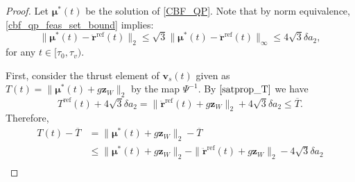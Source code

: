 \documentclass[journal,10pt]{IEEEtran}
\newcommand{\vect}[1]{\boldsymbol{\mathbf{#1}}}
\begin{document}
\begin{proof} 
Let $\vect{\mu}^*(t)$ be the solution of \eqref{CBF_QP}. Note that by norm equivalence, \eqref{cbf_qp_feas_set_bound} implies:
\begin{equation}
    \|\vect{\mu}^*(t) - \ddot{\vect{r}}^{\text{ref}}(t)\|_2\leq \sqrt{3}\|\vect{\mu}^*(t)-\ddot{\vect{r}}^{\text{ref}}(t)\|_\infty\leq4\sqrt{3}\delta a_2,\label{eqnprp3eq1}
\end{equation}
for any $t\in[\tau_0,\tau_v)$. 

First, consider the thrust element of $\vect{v}_s(t)$ given as $T(t) = \|\vect{\mu}^*(t)+g\vect{z}_W\|_2$ by the map $\Psi^{-1}$. By $\eqref{satprop_T}$ we have
\begin{equation}
    T^{\text{ref}}(t)+4\sqrt{3}\delta a_2 = \|\ddot{\vect{r}}^{\text{ref}}(t)+g\vect{z}_W\|_2+4\sqrt{3}\delta a_2 \leq \overline{T}.\label{eqnprp3eq2}
\end{equation}
Therefore, 
\begin{align*}
T(t) - \overline{T} &=\|\vect{\mu}^*(t)+g\vect{z}_W\|_2-\overline{T}\\
    &\leq \|\vect{\mu}^*(t)+g\vect{z}_W\|_2-\|\ddot{\vect{r}}^{\text{ref}}(t)+g\vect{z}_W\|_2-4\sqrt{3}\delta a_2\\

\end{align*}
\end{proof}
\end{document}
